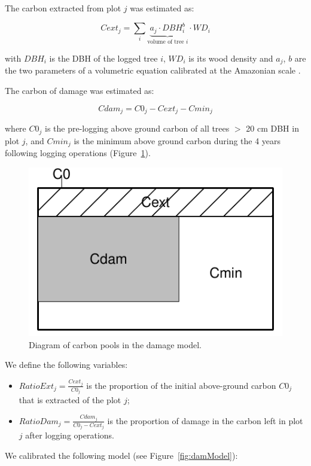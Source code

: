 \documentclass{article}
\begin{document}
The carbon extracted from plot $j$ was estimated as: 

\begin{equation}
    Cext_j = \sum_{i} \underbrace{a_j \cdot DBH_i^b}_{\text{volume of tree $i$}} \cdot WD_i
\end{equation}

with $DBH_i$ is the DBH of the logged tree $i$, $WD_i$ is its wood density and $a_j$, $b$ are the two parameters of a volumetric equation calibrated at the Amazonian scale \cite{Piponiotc}. 

The carbon of damage was estimated as: 

\begin{equation}
    Cdam_j = C0_j - Cext_j - Cmin_j
\end{equation}

where $C0_j$ is the pre-logging above ground carbon of all trees $>$ 20 cm DBH in plot $j$, and $Cmin_j$ is the minimum above ground carbon during the 4 years following logging operations (Figure~\ref{fig:schemaDam}). 

\begin{figure}
    \centering
    \includegraphics[width=0.6\linewidth]{graphs/schemaDam.pdf}
    \caption{Diagram of carbon pools in the damage model.}
    \label{fig:schemaDam}
\end{figure}

We define the following variables: 

\begin{itemize}
    \item $RatioExt_j=\frac{Cext_j}{C0_j}$ is the proportion of the initial above-ground carbon $C0_j$ that is extracted of the plot $j$; 
    \item $RatioDam_j = \frac{Cdam_j}{C0_j-Cext_j}$ is the proportion of damage in the carbon left in plot $j$ after logging operations. 
\end{itemize}

We calibrated the following model (see Figure~\ref{fig:damModel}): 
\end{document}
